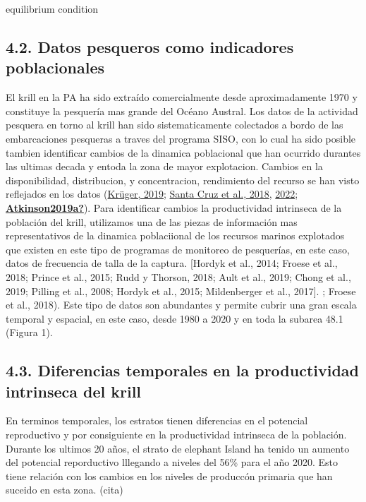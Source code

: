 \documentclass[
]{article}
\begin{document}
equilibrium condition

\hypertarget{datos-pesqueros-como-indicadores-poblacionales}{%
\subsection{4.2. Datos pesqueros como indicadores
poblacionales}\label{datos-pesqueros-como-indicadores-poblacionales}}

El krill en la PA ha sido extraído comercialmente desde aproximadamente
1970 y constituye la pesquería mas grande del Océano Austral. Los datos
de la actividad pesquera en torno al krill han sido sistematicamente
colectados a bordo de las embarcaciones pesqueras a traves del programa
SISO, con lo cual ha sido posible tambien identificar cambios de la
dinamica poblacional que han ocurrido durantes las ultimas decada y
entoda la zona de mayor explotacion. Cambios en la disponibilidad,
distribucion, y concentracion, rendimiento del recurso se han visto
reflejados en los datos (\protect\hyperlink{ref-Kruger2019}{Krüger,
2019}; \protect\hyperlink{ref-SantaCruz2018}{Santa Cruz et al., 2018},
\protect\hyperlink{ref-SantaCruz2022}{2022};
\protect\hyperlink{ref-Atkinson2019a}{\textbf{Atkinson2019a?}}). Para
identificar cambios la productividad intrinseca de la población del
krill, utilizamos una de las piezas de información mas representativos
de la dinamica poblaciional de los recursos marinos explotados que
existen en este tipo de programas de monitoreo de pesquerías, en este
caso, datos de frecuencia de talla de la captura. {[}Hordyk et al.,
2014; Froese et al., 2018; Prince et al., 2015; Rudd y Thorson, 2018;
Ault et al., 2019; Chong et al., 2019; Pilling et al., 2008; Hordyk et
al., 2015; Mildenberger et al., 2017{]}. ; Froese et al., 2018). Este
tipo de datos son abundantes y permite cubrir una gran escala temporal y
espacial, en este caso, desde 1980 a 2020 y en toda la subarea 48.1
(Figura 1).

\hypertarget{diferencias-temporales-en-la-productividad-intrinseca-del-krill}{%
\subsection{4.3. Diferencias temporales en la productividad intrinseca
del
krill}\label{diferencias-temporales-en-la-productividad-intrinseca-del-krill}}

En terminos temporales, los estratos tienen diferencias en el potencial
reproductivo y por consiguiente en la productividad intrinseca de la
población. Durante los ultimos 20 años, el strato de elephant Island ha
tenido un aumento del potencial reporductivo lllegando a niveles del
56\% para el año 2020. Esto tiene relación con los cambios en los
niveles de produccón primaria que han suceido en esta zona. (cita)
\end{document}
